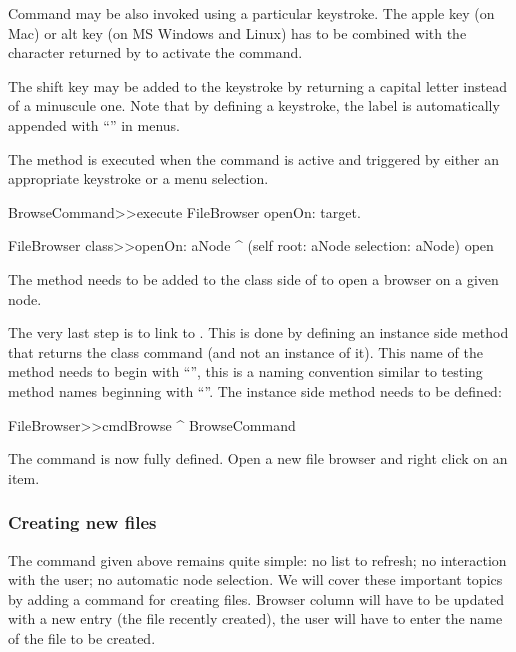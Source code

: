 \documentclass[a4paper,10pt,twoside]{book}
\begin{document}
Command may be also invoked using a particular keystroke. The apple key (on Mac) or alt key (on MS Windows and Linux) has to be combined with the character returned by  to activate the command.


The shift key may be added to the keystroke by returning a capital letter instead of a minuscule one. Note that by defining a keystroke, the label is automatically appended with ``'' in menus.

The method  is executed when the command is active and triggered by either an appropriate keystroke or a menu selection.

\begin{code}{}    
BrowseCommand>>execute
	FileBrowser openOn: target.

FileBrowser class>>openOn: aNode 
	^ (self root: aNode selection: aNode) open
\end{code}

The method  needs to be added to the class side of  to open a browser on a given node. 

The very last step is to link  to . This is done by defining an instance side method that returns the class command (and not an instance of it). This name of the method needs to begin with ``'', this is a naming convention similar to testing method names beginning with ``''. The instance side method needs to be defined:

\begin{code}{}    
FileBrowser>>cmdBrowse
	^ BrowseCommand
\end{code}

The command is now fully defined. Open a new file browser and right click on an item.

\subsubsection{Creating new files}

The command given above remains quite simple: no list to refresh; no interaction with the user; no automatic node selection. We will cover these important topics by adding a command for creating files. Browser column will have to be updated with a new entry (the file recently created), the user will have to enter the name of the file to be created.
\end{document}
